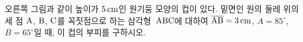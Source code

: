 \noindent\begin{minipage}[t]{0.58\linewidth}\vspace{0pt}\raggedright 오른쪽 그림과 같이 높이가 $5\mkern3mu \mathrm{cm}$인 원기둥 모양의 컵이 있다. 밑면인 원의 둘레 위의 세 점 $\mathrm{A}$, $\mathrm{B}$, $\mathrm{C}$를 꼭짓점으로 하는 삼각형~$\mathrm{ABC}$에 대하여 $\overline{\mathrm{AB}}=3\mkern3mu \mathrm{cm}$, $A=85^\circ$, $B=65^\circ$일 때, 이 컵의 부피를 구하시오. \end{minipage}\hfill\begin{minipage}[t]{0.4\linewidth}\vspace{0pt}\centering \resizebox{\ifdim\width>\linewidth\linewidth\else\width\fi}{!}{}\end{minipage}\par
